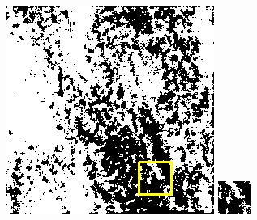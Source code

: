 \documentclass[10pt,UTF8,fntef]{ctexart}
\begin{document}
\begin{figure}[H]
{{\begin{minipage}[b]{0.15\linewidth}
            \includegraphics[width=1\linewidth]{../log/spoon3/cut/LC81321192014054LGN00_03249_segnet.jpg}\vspace{4pt}
            \includegraphics[width=1\linewidth]{../log/spoon3/cut/tmp_cut_LC81321192014054LGN00_03249_segnet.jpg}\vspace{4pt}

\end{minipage}}}
\end{figure}
\end{document}
